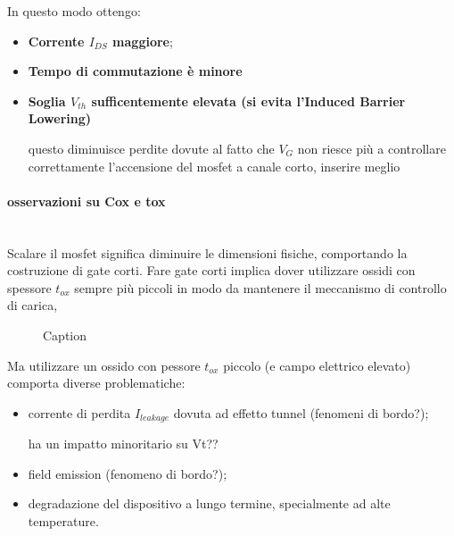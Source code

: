  In questo modo ottengo:
 \begin{itemize}
     \item \textbf{Corrente $I_{DS}$ maggiore};
     \item \textbf{Tempo di commutazione è minore}
     \item \textbf{Soglia $V_{th}$ sufficentemente elevata (si evita l'Induced Barrier Lowering)}
     \begin{exbox}
         questo diminuisce perdite dovute al fatto che $V_G$ non riesce più a controllare correttamente l'accensione del mosfet a canale corto, inserire meglio
     \end{exbox}
 \end{itemize}
\paragraph{osservazioni su Cox e tox}\mbox{}\\
 Scalare il mosfet significa diminuire le dimensioni fisiche, comportando la costruzione di gate corti. Fare gate corti implica dover utilizzare ossidi con spessore $t_{ox}$ sempre più piccoli in modo da mantenere il meccanismo di controllo di carica,
\begin{figure}
    \centering
    \caption{Caption}
    \label{fig:enter-label}
\end{figure}

 Ma utilizzare un ossido con pessore $t_{ox}$ piccolo (e campo elettrico elevato) comporta diverse problematiche:
 \begin{itemize}
     \item corrente di perdita $I_{leakage}$ dovuta ad effetto tunnel (fenomeni di bordo?);
     \begin{ricevimento}
         ha un impatto minoritario su Vt?? 
     \end{ricevimento}
     \item field emission (fenomeno di bordo?);
     \item degradazione del dispositivo a lungo termine, specialmente ad alte temperature.
 \end{itemize}


